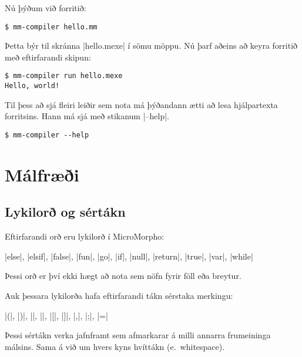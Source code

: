 \documentclass[12pt]{article}
\begin{document}
Nú þýðum við forritið:

\begin{mdframed}[style=langframe]
\begin{Verbatim}
$ mm-compiler hello.mm
\end{Verbatim}
\end{mdframed}

Þetta býr til skránna |hello.mexe| í sömu möppu.
Nú þarf aðeins að keyra forritið með eftirfarandi skipun:

\begin{mdframed}[style=langframe]
\begin{Verbatim}
$ mm-compiler run hello.mexe
Hello, world!
\end{Verbatim}
\end{mdframed}

Til þess að sjá fleiri leiðir sem nota má þýðandann
ætti að lesa hjálpartexta forritsins.
Hann má sjá með stikanum |--help|.

\begin{mdframed}[style=langframe]
\begin{Verbatim}
$ mm-compiler --help
\end{Verbatim}
\end{mdframed}

\section{Málfræði}
\subsection{Lykilorð og sértákn}\label{keywords}
Eftirfarandi orð eru lykilorð í MicroMorpho:

\begin{center}
    |else|,
    |elsif|,
    |false|,
    |fun|,
    |go|,
    |if|,
    |null|,
    |return|,
    |true|,
    |var|,
    |while|
\end{center}

Þessi orð er því ekki hægt að nota sem nöfn fyrir föll eða breytur.

Auk þessara lykilorða hafa eftirfarandi tákn sérstaka merkingu:

\begin{center}
    |(|,
    |)|,
    |{|,
    |}|,
    |[|,
    |]|,
    |,|,
    |;|,
    |=|
\end{center}

Þessi sértákn verka jafnframt sem afmarkarar á milli annarra frumeininga málsins.
Sama á við um hvers kyns hvíttákn (e.~whitespace).
\end{document}
